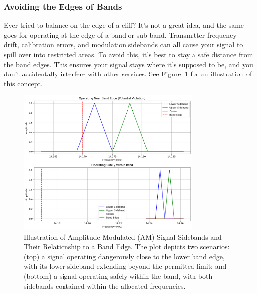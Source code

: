 \subsubsection*{Avoiding the Edges of Bands}
Ever tried to balance on the edge of a cliff? It’s not a great idea, and the same goes for operating at the edge of a band or sub-band. Transmitter frequency drift, calibration errors, and modulation sidebands can all cause your signal to spill over into restricted areas. To avoid this, it’s best to stay a safe distance from the band edges. This ensures your signal stays where it’s supposed to be, and you don’t accidentally interfere with other services. See Figure~\ref{fig:sidebands} for an illustration of this concept.


\begin{figure}[htbp]
    \centering
    \includegraphics[width=0.8\textwidth]{tech/images/sideband_edge.png}
    \caption{Illustration of Amplitude Modulated (AM) Signal Sidebands and Their Relationship to a Band Edge. The plot depicts two scenarios: (top) a signal operating dangerously close to the lower band edge, with its lower sideband extending beyond the permitted limit; and (bottom) a signal operating safely within the band, with both sidebands contained within the allocated frequencies.}
    \label{fig:sidebands}
\end{figure}


